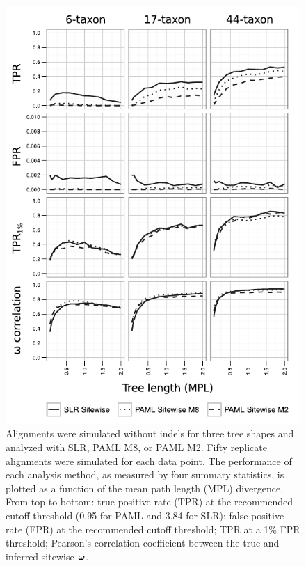 \documentclass{article}
\begin{document}
\begin{figure}[t]
\begin{center}
\includegraphics[scale=1.25]{fig2.pdf}
\end{center}
\caption{Alignments were simulated without indels for three tree
  shapes and analyzed with SLR, PAML M8, or PAML M2. Fifty replicate
  alignments were simulated for each data point. The performance of
  each analysis method, as measured by four summary statistics, is
  plotted as a function of the mean path length (MPL) divergence. From
  top to bottom: true positive rate (TPR) at the recommended cutoff
  threshold (0.95 for PAML and 3.84 for SLR); false positive rate
  (FPR) at the recommended cutoff threshold; TPR at a 1\% FPR
  threshold; Pearson's correlation coefficient between the true and
  inferred sitewise $\bm{\omega}$.}
\label{fig_2}
\end{figure}
\end{document}
